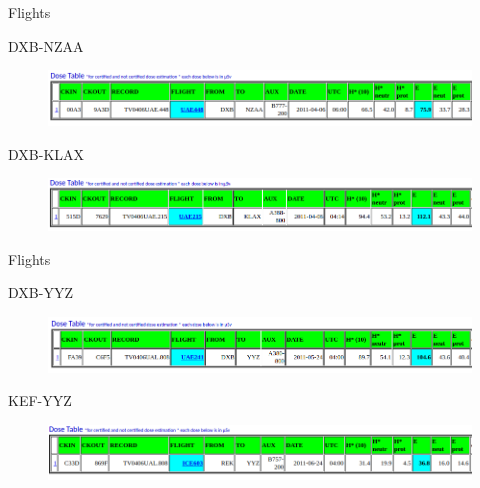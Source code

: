 \documentclass[aspectratio=1610]{beamer}
\begin{document}
\begin{frame}{Flights}
\begin{block}{DXB-NZAA}

\begin{figure}[]

   \includegraphics[width=1.0\textwidth]{EPCADR-RADIATION-DATA/OUTPUTS/DXB-NZAA.png}   
 \end{figure} 
 
\end{block}


\begin{block}{DXB-KLAX}

\begin{figure}[]

   \includegraphics[width=1.0\textwidth]{EPCADR-RADIATION-DATA/OUTPUTS/DXB-KLAX.png}   
 \end{figure} 
 
\end{block}


\end{frame}



\begin{frame}{Flights}
\begin{block}{DXB-YYZ}

\begin{figure}[]

   \includegraphics[width=1.0\textwidth]{EPCADR-RADIATION-DATA/OUTPUTS/DXB-YYZ.png}   
 \end{figure} 
 
\end{block}


\begin{block}{KEF-YYZ}

\begin{figure}[]

   \includegraphics[width=1.0\textwidth]{EPCADR-RADIATION-DATA/OUTPUTS/KEF-YYZ.png}   
    
 \end{figure} 

\end{block}

\end{frame}
\end{document}
